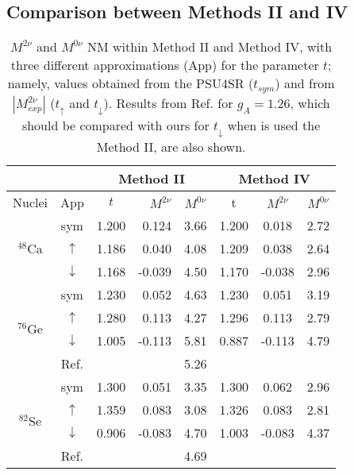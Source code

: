 \documentclass[nofootinbib,twocolumn,eqsecnum,floats,aps]{revtex4}
\def\sss{\scriptscriptstyle}
\def\sss{\scriptscriptstyle}
\begin{document}
{\subsection{Comparison between Methods  II and IV}\label{4B}
\begin{table}[t]
\caption{$M^{2\nu}$ and  $M^{0\nu}$  NM  within Method II and Method IV, with
three  different approximations (App) for the parameter $t$; namely,
values obtained from the PSU4SR %
($t_{sym}$) and   from $|M^{2\nu}_{exp}|$ ($t_\uparrow$ and $t_\downarrow$).
Results from
Ref.  \cite{Hyv15}  for $g_{\sss A}=1.26$, which  should be compared
with ours for $t_\downarrow$ when is used the Method II, are also shown.}
\label{T5}
\begin{center}
\begin{tabular}{|c|c|crc|ccc|}
\hline
 \multicolumn{2}{|c|}{}        & \multicolumn{3}{|c|}{Method II}& \multicolumn{3}{|c|}{Method IV}\\\hline
 Nuclei            &App           & $t$   & $M^{2\nu}$& $M^{0\nu}$ &   t    & $M^{2\nu}$ & $M^{0\nu}$ \\\hline
 \multirow{3}{*}{$^{48}$Ca} & sym & 1.200 &  0.124    &    3.66    & 1.200  &   0.018    & 2.72 \\
               &    $\uparrow$    & 1.186 &  0.040    &    4.08    & 1.209  &   0.038    & 2.64 \\
               &    $\downarrow$  & 1.168 & -0.039    &    4.50    & 1.170  &  -0.038    & 2.96 \\\hline
%
 \multirow{4}{*}{$^{76}$Ge} & sym & 1.230 &   0.052   &    4.63    & 1.230  &   0.051    & 3.19 \\
               &   $\uparrow$     & 1.280 &   0.113   &    4.27    & 1.296  &   0.113    & 2.79 \\
               &   $\downarrow$   & 1.005 &  -0.113   &    5.81    & 0.887  &  -0.113    & 4.79 \\
              &Ref. \cite{Hyv15}  &       &           &    5.26    &        &                                & \\\hline
%
\multirow{4}{*}{$^{82}$Se} & sym  & 1.300 &   0.051   &    3.35    & 1.300  &   0.062    & 2.96 \\
               &   $\uparrow$     & 1.359 &   0.083   &    3.08    & 1.326  &   0.083    & 2.81 \\
               &   $\downarrow$   & 0.906 &  -0.083   &    4.70    & 1.003  &  -0.083    & 4.37 \\
               &Ref. \cite{Hyv15} &       &           &    4.69    &        &            &  \\\hline

\end{tabular}
\end{center}
\end{table}}
\end{document}

